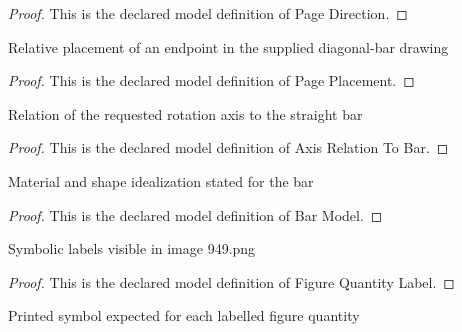 \begin{proof}
  This is the declared model definition of Page Direction.
\end{proof}
\begin{definition}
  \label{def:physics:phyx-mini-0949:phyxminiproblems-problemphyxmini0949-pageplacement}
  Relative placement of an endpoint in the supplied diagonal-bar drawing
\end{definition}
\begin{proof}
  This is the declared model definition of Page Placement.
\end{proof}
\begin{definition}
  \label{def:physics:phyx-mini-0949:phyxminiproblems-problemphyxmini0949-axisrelationtobar}
  Relation of the requested rotation axis to the straight bar
\end{definition}
\begin{proof}
  This is the declared model definition of Axis Relation To Bar.
\end{proof}
\begin{definition}
  \label{def:physics:phyx-mini-0949:phyxminiproblems-problemphyxmini0949-barmodel}
  Material and shape idealization stated for the bar
\end{definition}
\begin{proof}
  This is the declared model definition of Bar Model.
\end{proof}
\begin{definition}
  \label{def:physics:phyx-mini-0949:phyxminiproblems-problemphyxmini0949-figurequantitylabel}
  Symbolic labels visible in image 949.png
\end{definition}
\begin{proof}
  This is the declared model definition of Figure Quantity Label.
\end{proof}
\begin{definition}
  \label{def:physics:phyx-mini-0949:phyxminiproblems-problemphyxmini0949-expectedprintedsymbol}
  Printed symbol expected for each labelled figure quantity
\end{definition}

